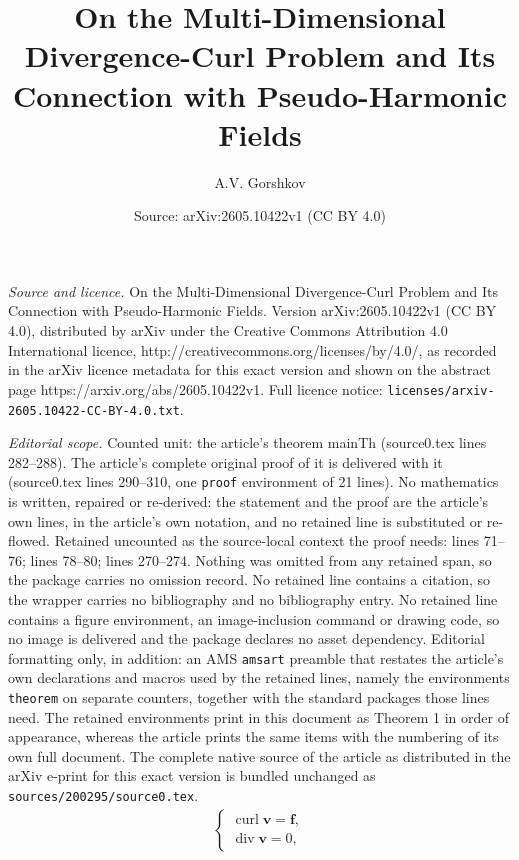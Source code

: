 \documentclass[10pt,a4paper]{amsart}
\title{On the Multi-Dimensional Divergence-Curl Problem and Its Connection with Pseudo-Harmonic Fields}
\author{A.V. Gorshkov}
\date{Source: arXiv:2605.10422v1 (CC BY 4.0)}
\newcommand{\bff}{\mathbf{f}}
\newcommand{\bv}{\mathbf{v}}
\newcommand{\curl}{\operatorname{curl}}
\newcommand{\divv}{\operatorname{div}}
\begin{document}
\maketitle

\noindent\emph{Source and licence.} On the Multi-Dimensional Divergence-Curl Problem and Its Connection with Pseudo-Harmonic Fields. Version arXiv:2605.10422v1 (CC BY 4.0), distributed by arXiv under the Creative Commons Attribution 4.0 International licence, http://creativecommons.org/licenses/by/4.0/, as recorded in the arXiv licence metadata for this exact version and shown on the abstract page https://arxiv.org/abs/2605.10422v1. Full licence notice: \texttt{licenses/arxiv-2605.10422-CC-BY-4.0.txt}.\par\smallskip

\noindent\textit{Editorial scope.} Counted unit: the article's theorem mainTh (source0.tex lines 282--288). The article's complete original proof of it is delivered with it (source0.tex lines 290--310, one \texttt{proof} environment of 21 lines). No mathematics is written, repaired or re-derived: the statement and the proof are the article's own lines, in the article's own notation, and no retained line is substituted or re-flowed.  Retained uncounted as the source-local context the proof needs: lines 71--76; lines 78--80; lines 270--274.  Nothing was omitted from any retained span, so the package carries no omission record.  No retained line contains a citation, so the wrapper carries no bibliography and no bibliography entry.  No retained line contains a figure environment, an image-inclusion command or drawing code, so no image is delivered and the package declares no asset dependency.  Editorial formatting only, in addition: an AMS \texttt{amsart} preamble that restates the article's own declarations and macros used by the retained lines, namely the environments \texttt{theorem} on separate counters, together with the standard packages those lines need.  The retained environments print in this document as Theorem 1 in order of appearance, whereas the article prints the same items with the numbering of its own full document.  The complete native source of the article as distributed in the arXiv e-print for this exact version is bundled unchanged as \texttt{sources/200295/source0.tex}.
\begin{align}\label{mainsyst}
\begin{cases}
\curl \bv = \bff,\\
\divv \bv = 0,
\end{cases}
\end{align}
\end{document}
